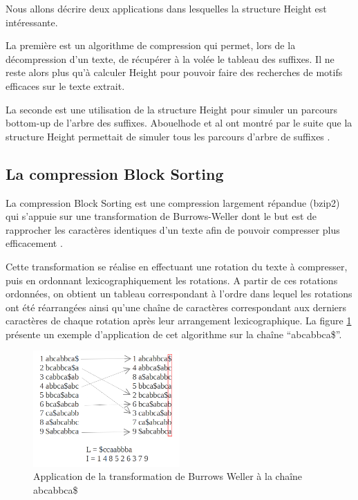 \documentclass[a4paper,10pt]{article}
\begin{document}
Nous allons décrire deux applications dans lesquelles la structure
Height est intéressante. 

La première est un algorithme de compression
qui permet, lors de la décompression d'un texte, de récupérer à la
volée le tableau des suffixes. Il ne reste alors plus qu'à calculer
Height pour pouvoir faire des recherches de motifs efficaces sur le
texte extrait.

La seconde est une utilisation de la structure Height pour simuler un
parcours bottom-up de l'arbre des suffixes. Abouelhode et al ont
montré par le suite que la structure Height permettait de simuler tous
les parcours d'arbre de suffixes \cite{Abouelhoda200453}.

\subsection{La compression Block Sorting}
\label{sec:blocksorting}

La compression Block Sorting est une compression largement répandue
(bzip2) qui s'appuie sur une transformation de Burrows-Weller
dont le but est de rapprocher les caractères identiques d'un texte
afin de pouvoir compresser plus efficacement \cite{Burrows94}.

Cette transformation se réalise en effectuant une rotation du texte à
compresser, puis en ordonnant lexicographiquement les rotations. A
partir de ces rotations ordonnées, on obtient un tableau correspondant
à l'ordre dans lequel les rotations ont été réarrangées ainsi qu'une
chaîne de caractères correspondant aux derniers caractères de chaque
rotation après leur arrangement lexicographique. La figure
\ref{fig:burrows} présente un exemple d'application de cet algorithme
sur la chaîne ``abcabbca\$''. 

\begin{figure}
  \centering
  \includegraphics[width=0.5\textwidth]{full_burrows}
  \caption{Application de la transformation de Burrows Weller à la
    chaîne abcabbca\$}
  \label{fig:burrows}
\end{figure}
\end{document}
